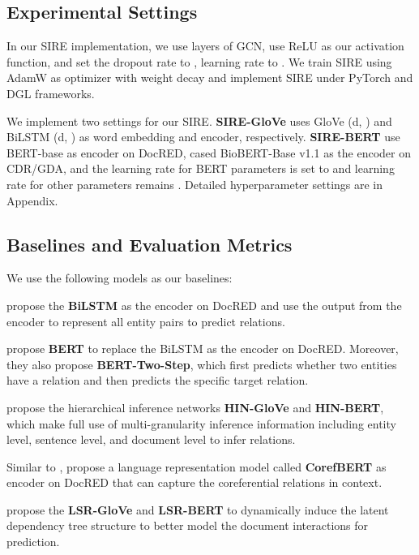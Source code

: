 \documentclass[11pt,a4paper]{article}
\begin{document}
\subsection{Experimental Settings}
In our SIRE implementation, we use  layers of GCN, use ReLU as our activation function, and set the dropout rate to , learning rate to .
We train SIRE using AdamW \citep{adamW} as optimizer with weight decay  and implement SIRE under PyTorch \citep{PyTorch} and DGL \citep{DGL} frameworks.

We implement two settings for our SIRE. \textbf{SIRE-GloVe} uses GloVe (d, \citealp{GloVe}) and BiLSTM (d, \citealp{BiLSTM}) as word embedding and encoder, respectively.
\textbf{SIRE-BERT} use BERT-base \citep{BERT} as encoder on DocRED, cased BioBERT-Base v1.1 as the encoder on CDR/GDA, and the learning rate for BERT parameters is set to  and learning rate for other parameters remains .
Detailed hyperparameter settings are in Appendix.


\subsection{Baselines and Evaluation Metrics}

We use the following models as our baselines:

\citet{DocRED-paper} propose the \textbf{BiLSTM} \citep{BiLSTM} as the encoder on DocRED and use the output from the encoder to represent all entity pairs to predict relations. 

\citet{finetune-bert} propose \textbf{BERT} to replace the BiLSTM as the encoder on DocRED. Moreover, they also propose \textbf{BERT-Two-Step}, which first predicts whether two entities have a relation and then predicts the specific target relation. 

\citet{HIN} propose the hierarchical inference networks \textbf{HIN-GloVe} and \textbf{HIN-BERT}, which make full use of multi-granularity inference information including entity level, sentence level, and document level to infer relations.

Similar to \citet{finetune-bert}, \citet{CorefBERT} propose a language representation model called \textbf{CorefBERT} as encoder on DocRED that can capture the coreferential relations in context.

\citet{LSR} propose the \textbf{LSR-GloVe} and \textbf{LSR-BERT} to dynamically induce the latent dependency tree structure to better model the document interactions for prediction. 
\end{document}
